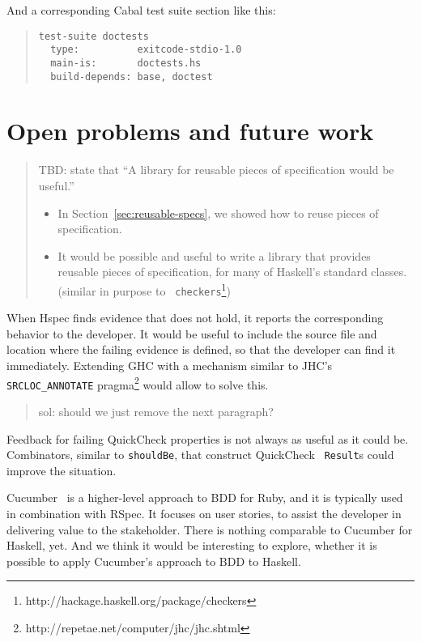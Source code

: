 \documentclass[preprint]{sigplanconf}
\begin{document}
\noindent And a corresponding Cabal test suite section like this:

\begin{quote}
\small
\begin{verbatim}
test-suite doctests
  type:          exitcode-stdio-1.0
  main-is:       doctests.hs
  build-depends: base, doctest
\end{verbatim}
\end{quote}

\section{Open problems and future work}


\begin{quote}
    TBD: state that ``A library for reusable pieces of specification would be
    useful.''
\begin{itemize}
    \item
        In Section~\ref{sec:reusable-specs}, we showed how to reuse
        pieces of specification.
    \item
        It would be possible and useful to write a library that
        provides reusable pieces of specification, for many of
        Haskell's standard classes.
        (similar in purpose to
        {\tt
        checkers}\footnote{http://hackage.haskell.org/package/checkers})
\end{itemize}
\end{quote}

When Hspec finds evidence that does not hold, it reports the
corresponding behavior to the developer.  It would be useful to
include the source file and location where the failing evidence is
defined, so that the developer can find it immediately.
Extending GHC with a mechanism similar to JHC's
\verb|SRCLOC_ANNOTATE| pragma\footnote{%
http://repetae.net/computer/jhc/jhc.shtml} would allow to solve this.


\begin{quote}
    sol: should we just remove the next paragraph?
\end{quote}

Feedback for failing QuickCheck properties is not always as useful as
it could be.
Combinators, similar to {\tt shouldBe}, that construct QuickCheck {\tt
Result}s could improve the situation.

Cucumber~\cite{cucumber} is a higher-level approach to BDD for Ruby, and
it is typically used in combination with RSpec.
It focuses on user stories, to assist the developer in delivering
value to the stakeholder.
There is nothing comparable to Cucumber for Haskell, yet.  And we think
it would be interesting to explore, whether it is possible to apply
Cucumber's approach to BDD to Haskell.
\end{document}
